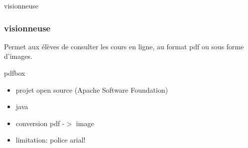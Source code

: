 \documentclass{beamer}
\begin{document}
\begin{frame}{visionneuse}
  \subsubsection {visionneuse}
	Permet aux élèves de consulter les cours en ligne, au format pdf ou sous forme d'images.
	\begin{block}{pdfbox}
		\begin{itemize}
			\item projet open source (Apache Software Foundation)
			\item java 
			\item conversion pdf -$>$ image
			\item limitation: police arial!
		\end{itemize}
	\end{block}
\end{frame}
\end{document}
